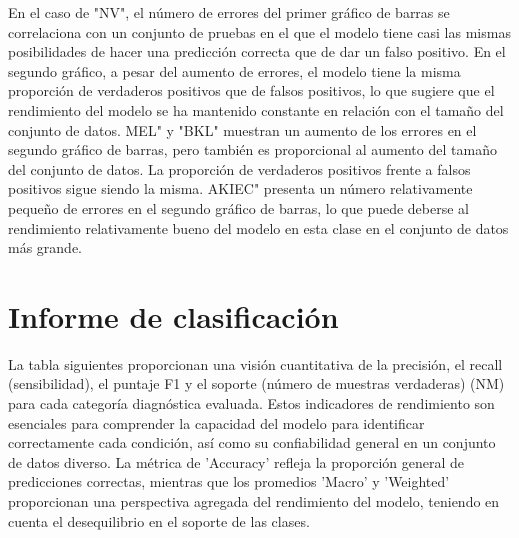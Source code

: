 En el caso de "NV", el número de errores del primer gráfico de barras se correlaciona con un conjunto de pruebas en el que el modelo tiene casi las mismas posibilidades de hacer una predicción correcta que de dar un falso positivo. En el segundo gráfico, a pesar del aumento de errores, el modelo tiene la misma proporción de verdaderos positivos que de falsos positivos, lo que sugiere que el rendimiento del modelo se ha mantenido constante en relación con el tamaño del conjunto de datos. MEL" y "BKL" muestran un aumento de los errores en el segundo gráfico de barras, pero también es proporcional al aumento del tamaño del conjunto de datos. La proporción de verdaderos positivos frente a falsos positivos sigue siendo la misma.
AKIEC" presenta un número relativamente pequeño de errores en el segundo gráfico de barras, lo que puede deberse al rendimiento relativamente bueno del modelo en esta clase en el conjunto de datos más grande.

\section*{Informe de clasificación}

La tabla siguientes proporcionan una visión cuantitativa de la precisión, el recall (sensibilidad), el puntaje F1 y el soporte (número de muestras verdaderas) (NM) para cada categoría diagnóstica evaluada. Estos indicadores de rendimiento son esenciales para comprender la capacidad del modelo para identificar correctamente cada condición, así como su confiabilidad general en un conjunto de datos diverso. La métrica de 'Accuracy' refleja la proporción general de predicciones correctas, mientras que los promedios 'Macro' y 'Weighted' proporcionan una perspectiva agregada del rendimiento del modelo, teniendo en cuenta el desequilibrio en el soporte de las clases. 

